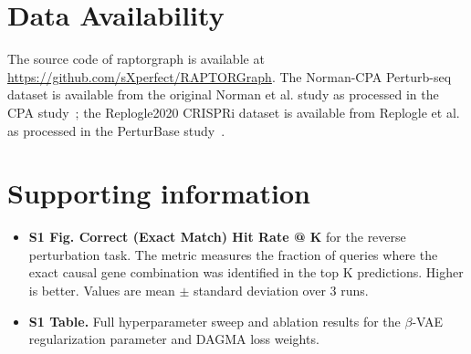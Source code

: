 \documentclass[10pt,letterpaper]{article}
\theoremstyle{definition}
\theoremstyle{remark}
\begin{document}
\nolinenumbers

\section*{Data Availability}
The source code of \gls{raptorgraph} is available at \url{https://github.com/sXperfect/RAPTORGraph}.
The Norman-CPA Perturb-seq dataset is available from the original Norman et al. study as processed in the CPA study~\cite{norman2019exploring,lotfollahi_predicting_2023}; the Replogle2020 CRISPRi dataset is available from Replogle et al. as processed in the PerturBase study~\cite{replogle_combinatorial_2020,wei_perturbase_2024}.

\nolinenumbers







\section*{Supporting information}
\begin{itemize}
\item \textbf{S1 Fig. Correct (Exact Match) Hit Rate @ K} for the reverse perturbation task. The metric measures the fraction of queries where the exact causal gene combination was identified in the top K predictions. Higher is better. Values are mean $\pm$ standard deviation over 3 runs.
\item \textbf{S1 Table.} Full hyperparameter sweep and ablation results for the $\beta$-VAE regularization parameter and DAGMA loss weights.
\end{itemize}


\end{document}
